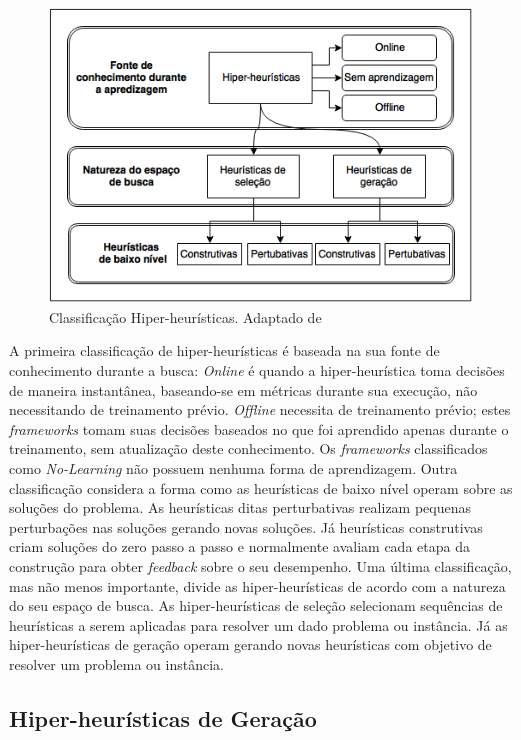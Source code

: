 \begin{figure}[!htb]
	\centering
	\includegraphics[scale=0.8]{Imagens/ClassificacaoHiperHeuristica.png}
	\caption{Classificação Hiper-heurísticas. Adaptado de \cite{sabar2015automatic}}
	\label{img:classificacaoHiperHeuristicas}
\end{figure}

A primeira classificação de hiper-heurísticas é baseada na sua fonte de conhecimento durante a busca: \textit{Online} é quando a hiper-heurística toma decisões de maneira instantânea, baseando-se em métricas durante sua execução, não necessitando de treinamento prévio. \textit{Offline} necessita de treinamento prévio; estes \textit{frameworks}  tomam suas decisões baseados no que foi aprendido apenas durante o treinamento, sem atualização deste conhecimento. Os \textit{frameworks} classificados como \textit{No-Learning} não possuem nenhuma forma de aprendizagem. Outra classificação considera a forma como as heurísticas de baixo nível operam sobre as soluções do problema. As heurísticas ditas perturbativas realizam pequenas perturbações nas soluções gerando novas soluções. Já heurísticas construtivas criam soluções do zero passo a passo e normalmente avaliam cada etapa da construção para obter \textit{feedback} sobre o seu desempenho. Uma última  classificação, mas não menos importante, divide as hiper-heurísticas de acordo com a  natureza do seu espaço de busca. As hiper-heurísticas de seleção selecionam sequências de heurísticas a serem aplicadas para resolver um dado problema ou instância. Já as hiper-heurísticas de geração operam gerando novas heurísticas com objetivo de resolver um problema ou instância.


\subsection{Hiper-heurísticas de Geração}
\label{Hiper-Heuristicas-Geraçao}

